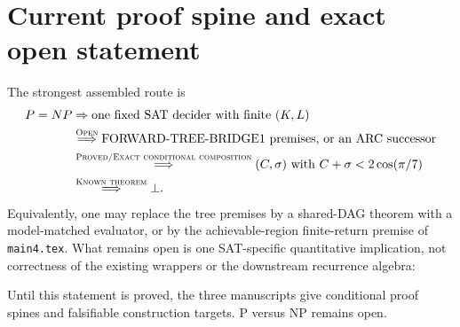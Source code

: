 \documentclass[11pt]{article}
\newcommand{\gammats}{2\cos(\pi/7)}
\begin{document}
\section{Current proof spine and exact open statement}
The strongest assembled route is
\[
\begin{aligned}
P=NP
&\Rightarrow \text{one fixed SAT decider with finite }(K,L)\\
&\overset{\textsc{Open}}{\Longrightarrow}
  \text{FORWARD-TREE-BRIDGE1 premises, or an ARC successor}\\
&\overset{\textsc{Proved/Exact conditional composition}}{\Longrightarrow}
  (C,\sigma)\text{ with }C+\sigma<\gammats\\
&\overset{\textsc{Known theorem}}{\Longrightarrow}\bot.
\end{aligned}
\]
Equivalently, one may replace the tree premises by a shared-DAG theorem with
a model-matched evaluator, or by the achievable-region finite-return premise
of \texttt{main4.tex}.  What remains open is one SAT-specific quantitative
implication, not correctness of the existing wrappers or the downstream
recurrence algebra:
\begin{center}
\end{center}
Until this statement is proved, the three manuscripts give conditional proof
spines and falsifiable construction targets.  P versus NP remains open.
\end{document}
